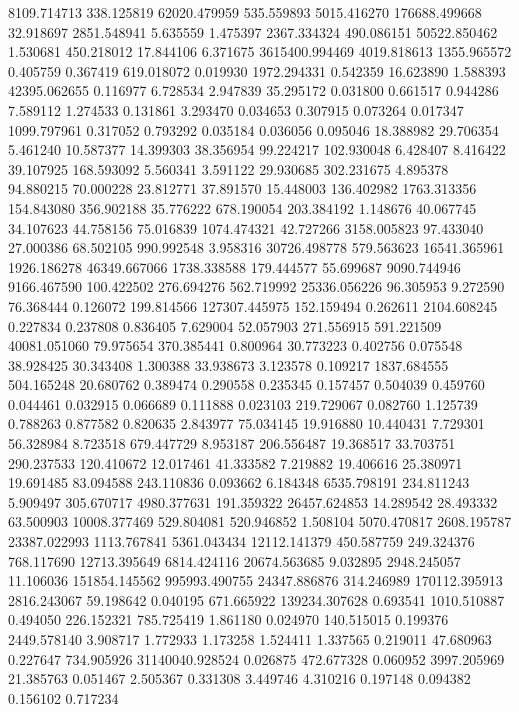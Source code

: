 8109.714713
338.125819
62020.479959
535.559893
5015.416270
176688.499668
32.918697
2851.548941
5.635559
1.475397
2367.334324
490.086151
50522.850462
1.530681
450.218012
17.844106
6.371675
3615400.994469
4019.818613
1355.965572
0.405759
0.367419
619.018072
0.019930
1972.294331
0.542359
16.623890
1.588393
42395.062655
0.116977
6.728534
2.947839
35.295172
0.031800
0.661517
0.944286
7.589112
1.274533
0.131861
3.293470
0.034653
0.307915
0.073264
0.017347
1099.797961
0.317052
0.793292
0.035184
0.036056
0.095046
18.388982
29.706354
5.461240
10.587377
14.399303
38.356954
99.224217
102.930048
6.428407
8.416422
39.107925
168.593092
5.560341
3.591122
29.930685
302.231675
4.895378
94.880215
70.000228
23.812771
37.891570
15.448003
136.402982
1763.313356
154.843080
356.902188
35.776222
678.190054
203.384192
1.148676
40.067745
34.107623
44.758156
75.016839
1074.474321
42.727266
3158.005823
97.433040
27.000386
68.502105
990.992548
3.958316
30726.498778
579.563623
16541.365961
1926.186278
46349.667066
1738.338588
179.444577
55.699687
9090.744946
9166.467590
100.422502
276.694276
562.719992
25336.056226
96.305953
9.272590
76.368444
0.126072
199.814566
127307.445975
152.159494
0.262611
2104.608245
0.227834
0.237808
0.836405
7.629004
52.057903
271.556915
591.221509
40081.051060
79.975654
370.385441
0.800964
30.773223
0.402756
0.075548
38.928425
30.343408
1.300388
33.938673
3.123578
0.109217
1837.684555
504.165248
20.680762
0.389474
0.290558
0.235345
0.157457
0.504039
0.459760
0.044461
0.032915
0.066689
0.111888
0.023103
219.729067
0.082760
1.125739
0.788263
0.877582
0.820635
2.843977
75.034145
19.916880
10.440431
7.729301
56.328984
8.723518
679.447729
8.953187
206.556487
19.368517
33.703751
290.237533
120.410672
12.017461
41.333582
7.219882
19.406616
25.380971
19.691485
83.094588
243.110836
0.093662
6.184348
6535.798191
234.811243
5.909497
305.670717
4980.377631
191.359322
26457.624853
14.289542
28.493332
63.500903
10008.377469
529.804081
520.946852
1.508104
5070.470817
2608.195787
23387.022993
1113.767841
5361.043434
12112.141379
450.587759
249.324376
768.117690
12713.395649
6814.424116
20674.563685
9.032895
2948.245057
11.106036
151854.145562
995993.490755
24347.886876
314.246989
170112.395913
2816.243067
59.198642
0.040195
671.665922
139234.307628
0.693541
1010.510887
0.494050
226.152321
785.725419
1.861180
0.024970
140.515015
0.199376
2449.578140
3.908717
1.772933
1.173258
1.524411
1.337565
0.219011
47.680963
0.227647
734.905926
31140040.928524
0.026875
472.677328
0.060952
3997.205969
21.385763
0.051467
2.505367
0.331308
3.449746
4.310216
0.197148
0.094382
0.156102
0.717234
